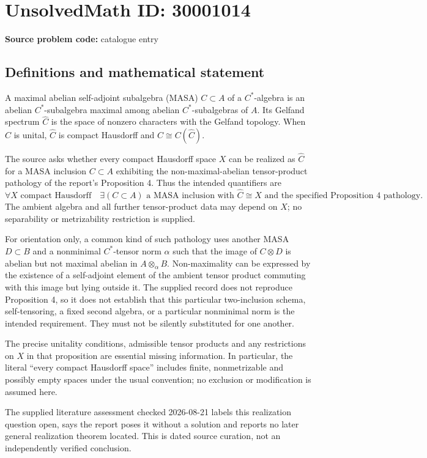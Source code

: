 \documentclass[11pt]{article}
\begin{document}
\section*{UnsolvedMath ID: 30001014}
\textbf{Source problem code:} catalogue entry
\subsection{Definitions and mathematical statement}
A maximal abelian self-adjoint subalgebra (MASA) $C\subset A$ of a $C^*$-algebra is an abelian $C^*$-subalgebra maximal among abelian $C^*$-subalgebras of $A$. Its Gelfand spectrum $\widehat C$ is the space of nonzero characters with the Gelfand topology. When $C$ is unital, $\widehat C$ is compact Hausdorff and $C\cong C(\widehat C)$.

The source asks whether every compact Hausdorff space $X$ can be realized as $\widehat C$ for a MASA inclusion $C\subset A$ exhibiting the non-maximal-abelian tensor-product pathology of the report's Proposition 4. Thus the intended quantifiers are
\[
\forall X\text{ compact Hausdorff}\quad
\exists(C\subset A)\text{ a MASA inclusion with }\widehat C\cong X
\text{ and the specified Proposition 4 pathology}.
\]
The ambient algebra and all further tensor-product data may depend on $X$; no separability or metrizability restriction is supplied.

For orientation only, a common kind of such pathology uses another MASA $D\subset B$ and a nonminimal $C^*$-tensor norm $\alpha$ such that the image of $C\otimes D$ is abelian but not maximal abelian in $A\otimes_\alpha B$. Non-maximality can be expressed by the existence of a self-adjoint element of the ambient tensor product commuting with this image but lying outside it. The supplied record does not reproduce Proposition 4, so it does not establish that this particular two-inclusion schema, self-tensoring, a fixed second algebra, or a particular nonminimal norm is the intended requirement. They must not be silently substituted for one another.

The precise unitality conditions, admissible tensor products and any restrictions on $X$ in that proposition are essential missing information. In particular, the literal ``every compact Hausdorff space'' includes finite, nonmetrizable and possibly empty spaces under the usual convention; no exclusion or modification is assumed here.

The supplied literature assessment checked 2026-08-21 labels this realization question open, says the report poses it without a solution and reports no later general realization theorem located. This is dated source curation, not an independently verified conclusion.
\end{document}
